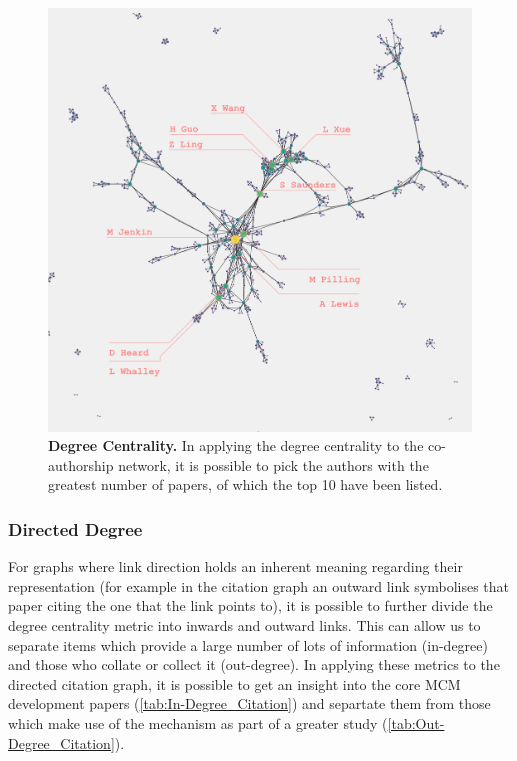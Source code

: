 \begin{figure}[H]
     \centering
         \includegraphics[width=.8\textwidth]{figures_c3/degreeauthor.png}
         
        \caption{ \textbf{Degree Centrality.} In applying the degree centrality to the co-authorship network, it is possible to pick the authors with the greatest number of papers, of which the top 10 have been listed.}
        \label{fig:degauth}
\end{figure}

% 
% 
% 

\subsubsection*{Directed Degree}
For graphs where link direction holds an inherent meaning regarding their representation (for example in the citation graph an outward link symbolises that paper citing the one that the link points to), it is possible to further divide the degree centrality metric into inwards and outward links. This can allow us to separate items which provide a large number of lots of information (in-degree) and those who collate or collect it (out-degree). In applying these metrics to the directed citation graph, it is possible to get an insight into the core MCM development papers (\autoref{tab:In-Degree_Citation}) and separtate them from those which make use of the mechanism as part of a greater study (\autoref{tab:Out-Degree_Citation}).



